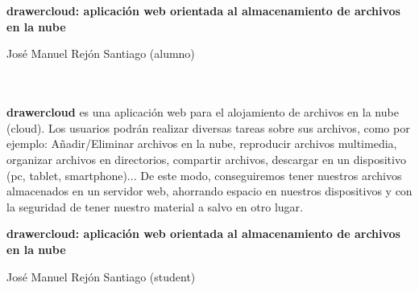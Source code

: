 \chapter*{}




\clearpage
\thispagestyle{empty}

\begin{center}
{\large\bfseries drawercloud: aplicación web orientada al almacenamiento de archivos en la nube}\\
\end{center}
\begin{center}
José Manuel Rejón Santiago (alumno)\\
\end{center}

\\

\vspace{0.5cm}
\\

\textbf{drawercloud} es una aplicación web para el alojamiento de archivos en la nube (cloud). Los usuarios podrán realizar diversas tareas sobre sus archivos, como por ejemplo: Añadir/Eliminar archivos en la nube, reproducir archivos multimedia, organizar archivos en directorios, compartir archivos, descargar en un dispositivo (pc, tablet, smartphone)... De este modo, conseguiremos tener nuestros archivos almacenados en un servidor web, ahorrando espacio en nuestros dispositivos y con la seguridad de tener nuestro material a salvo en otro lugar.\\

\clearpage


\thispagestyle{empty}


\begin{center}
{\large\bfseries drawercloud: aplicación web orientada al almacenamiento de archivos en la nube}\\
\end{center}
\begin{center}
José Manuel Rejón Santiago (student)\\
\end{center}

\\

